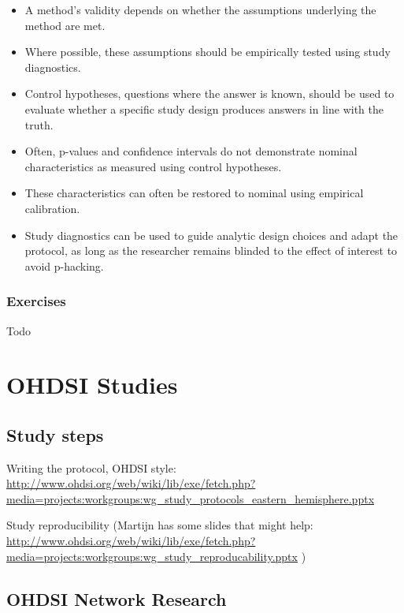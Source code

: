\documentclass[11pt]{book}
\theoremstyle{definition}
\theoremstyle{definition}
\theoremstyle{definition}
\theoremstyle{remark}
\let\BeginKnitrBlock\begin \let\EndKnitrBlock\end
\begin{document}
\BeginKnitrBlock{rmdsummary}
\begin{itemize}
\item
  A method's validity depends on whether the assumptions underlying the method are met.
\item
  Where possible, these assumptions should be empirically tested using study diagnostics.
\item
  Control hypotheses, questions where the answer is known, should be used to evaluate whether a specific study design produces answers in line with the truth.
\item
  Often, p-values and confidence intervals do not demonstrate nominal characteristics as measured using control hypotheses.
\item
  These characteristics can often be restored to nominal using empirical calibration.
\item
  Study diagnostics can be used to guide analytic design choices and adapt the protocol, as long as the researcher remains blinded to the effect of interest to avoid p-hacking.
\end{itemize}
\EndKnitrBlock{rmdsummary}

\hypertarget{exercises-5}{%
\section{Exercises}\label{exercises-5}}

Todo

\hypertarget{part-ohdsi-studies}{%
\part{OHDSI Studies}\label{part-ohdsi-studies}}

\hypertarget{StudySteps}{%
\chapter{Study steps}\label{StudySteps}}

Writing the protocol, OHDSI style: \url{http://www.ohdsi.org/web/wiki/lib/exe/fetch.php?media=projects:workgroups:wg_study_protocols_eastern_hemisphere.pptx}

Study reproducibility (Martijn has some slides that might help: \url{http://www.ohdsi.org/web/wiki/lib/exe/fetch.php?media=projects:workgroups:wg_study_reproducability.pptx} )

\hypertarget{NetworkResearch}{%
\chapter{OHDSI Network Research}\label{NetworkResearch}}
\end{document}
